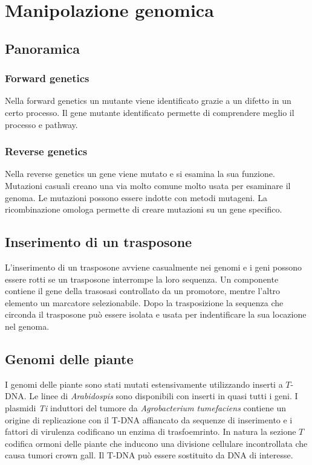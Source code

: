 \section{Manipolazione genomica}

	\subsection{Panoramica}

		\subsubsection{Forward genetics}
		Nella forward genetics un mutante viene identificato grazie a un difetto in un certo processo.
		Il gene mutante identificato permette di comprendere meglio il processo e pathway.

		\subsubsection{Reverse genetics}
		Nella reverse genetics un gene viene mutato e si esamina la sua funzione.
		Mutazioni casuali creano una via molto comune molto usata per esaminare il genoma.
		Le mutazioni possono essere indotte con metodi mutageni.
		La ricombinazione omologa permette di creare mutazioni su un gene specifico.

	\subsection{Inserimento di un trasposone}
	L'inserimento di un trasposone avviene casualmente nei genomi e i geni possono essere rotti se un trasposone interrompe la loro sequenza.
	Un componente contiene il gene della trasosasi controllato da un promotore, mentre l'altro elemento un marcatore selezionabile.
	Dopo la trasposizione la sequenza che circonda il trasposone pu\`o essere isolata e usata per indentificare la sua locazione nel genoma.

	\subsection{Genomi delle piante}
	I genomi delle piante sono stati mutati estensivamente utilizzando inserti a $T$-DNA.
	Le linee di \emph{Arabidospis} sono disponibili con inserti in quasi tutti i geni.
	I plasmidi \emph{Ti} induttori del tumore da \emph{Agrobacterium tumefaciens} contiene un origine di replicazione con il T-DNA affiancato da sequenze di inserimento e i fattori di virulenza codificano un enzima di trasfoemrinto.
	In natura la sezione $T$ codifica ormoni delle piante che inducono una divisione cellulare incontrollata che causa tumori crown gall.
	Il T-DNA pu\`o essere sostituito da DNA di interesse.

